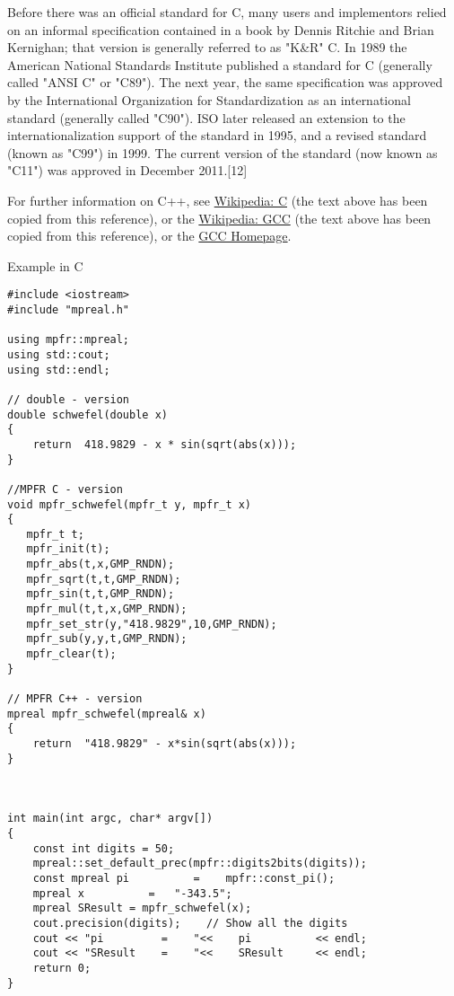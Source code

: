 \vpara
Before there was an official standard for C, many users and implementors relied on an informal specification contained in a book by Dennis Ritchie and Brian Kernighan; that version is generally referred to as "K\&R" C. In 1989 the American National Standards Institute published a standard for C (generally called "ANSI C" or "C89"). The next year, the same specification was approved by the International Organization for Standardization as an international standard (generally called "C90"). ISO later released an extension to the internationalization support of the standard in 1995, and a revised standard (known as "C99") in 1999. The current version of the standard (now known as "C11") was approved in December 2011.[12]


\vpara
For further information on C++, see \href{http://en.wikipedia.org/wiki/C_(programming_language)}{Wikipedia: C} (the text above has been copied from this reference), or the  \href{http://en.wikipedia.org/wiki/GNU_Compiler_Collection}{Wikipedia: GCC} (the text above has been copied from this reference), or the  \href{http://gcc.gnu.org/}{GCC Homepage}.



\vpara
Example in C


\begin{lstlisting}
#include <iostream>
#include "mpreal.h"

using mpfr::mpreal;    
using std::cout;
using std::endl;

// double - version
double schwefel(double x)
{
    return  418.9829 - x * sin(sqrt(abs(x)));
}
 
//MPFR C - version
void mpfr_schwefel(mpfr_t y, mpfr_t x)
{
   mpfr_t t;
   mpfr_init(t);
   mpfr_abs(t,x,GMP_RNDN);
   mpfr_sqrt(t,t,GMP_RNDN);
   mpfr_sin(t,t,GMP_RNDN);
   mpfr_mul(t,t,x,GMP_RNDN);
   mpfr_set_str(y,"418.9829",10,GMP_RNDN);
   mpfr_sub(y,y,t,GMP_RNDN);
   mpfr_clear(t);
}

// MPFR C++ - version
mpreal mpfr_schwefel(mpreal& x)
{
    return  "418.9829" - x*sin(sqrt(abs(x)));
}



int main(int argc, char* argv[])
{
    const int digits = 50; 
    mpreal::set_default_prec(mpfr::digits2bits(digits));
    const mpreal pi          =    mpfr::const_pi();
	mpreal x          =   "-343.5"; 
    mpreal SResult = mpfr_schwefel(x);
    cout.precision(digits);    // Show all the digits
    cout << "pi         =    "<<    pi          << endl;    
    cout << "SResult    =    "<<    SResult     << endl;   
    return 0;
}
\end{lstlisting}


